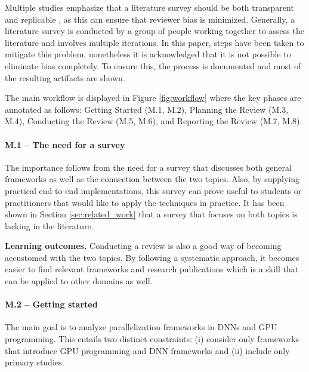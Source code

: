 Multiple studies emphasize that a literature survey should be both transparent and replicable
\cite{keele_systematic_2007, dos_santos_sustainable_2024-1}, as this can ensure that reviewer bias
is minimized. Generally, a literature survey is conducted by a group of people working together to
assess the literature and involves multiple iterations. In this paper, steps have been taken to
mitigate this problem, nonetheless it is acknowledged that it is not possible to eliminate bias
completely. To ensure this, the process is documented and most of the resulting artifacts are
shown.


The main workflow is displayed in Figure \ref{fig:workflow} where the key phases are annotated as
follows: Getting Started (M.1, M.2), Planning the Review (M.3, M.4), Conducting the Review (M.5,
M.6), and Reporting the Review (M.7, M.8).

\paragraph{M.1 -- The need for a survey}
\label{sec:need_for_survey}
The importance follows from the need for a survey that discusses both general frameworks as well as
the connection between the two topics. Also, by supplying practical end-to-end implementations, this
survey can prove useful to students or practitioners that would like to apply the techniques in practice.
It has been shown in Section \ref{sec:related_work} that a survey that focuses on both topics is lacking
in the literature.

\textbf{Learning outcomes.}
Conducting a review is also a good way of becoming accustomed with the two topics. By following a
systematic approach, it becomes easier to find relevant frameworks and research publications which
is a skill that can be applied to other domains as well.

\paragraph{M.2 -- Getting started}
\label{sec:research_questions}
The main goal is to analyze parallelization frameworks in DNNs and GPU programming. This entails two distinct
constraints: (i) consider only frameworks that introduce GPU programming and DNN frameworks and (ii) include
only primary studies.

